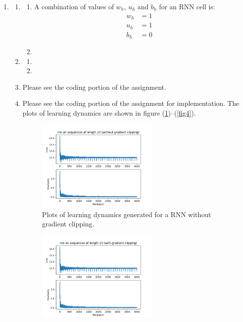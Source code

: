 \documentclass[10pt,reqno]{amsart}
\begin{document}
\begin{enumerate}[topsep=0pt,itemsep=3ex,partopsep=1ex,parsep=1ex]
\item
  \begin{enumerate}[itemsep=2ex]
  \item 
    \begin{enumerate}[itemsep=2ex]
      \item A combination of values of $w_h$, $u_h$ and $b_h$ for an RNN cell is:
        \begin{align*}
          w_h &= 1 \\
          u_h &= 1 \\
          b_h &= 0
        \end{align*}
      \item 
    \end{enumerate}
  \item
    \begin{enumerate}[itemsep=2ex]
      \item
      \item 
    \end{enumerate}
  \item Please see the coding portion of the assignment.
  \item Please see the coding portion of the assignment for implementation.
    The plots of learning dynamics are shown in figure (\ref{fig1})--(\ref{fig4}).
    \begin{figure}[h]
      \includegraphics[width=0.6\textwidth]{../code/q3-noclip-rnn.png}
      \caption{Plots of learning dynamics generated for a RNN without gradient clipping.}
      \label{fig1}
    \end{figure}
    \begin{figure}[h]
      \includegraphics[width=0.6\textwidth]{../code/q3-clip-rnn.png}

\end{figure}
\end{enumerate}
\end{enumerate}
\end{document}
